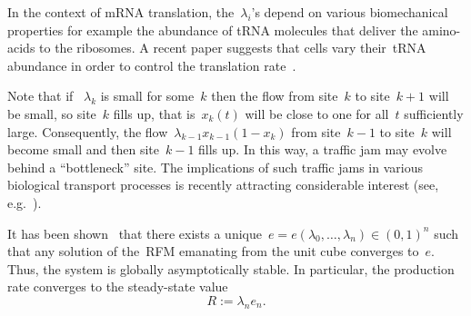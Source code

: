 In the context of mRNA translation, the~$\lambda_i$'s depend on various biomechanical properties for example the abundance of tRNA molecules that deliver the amino-acids to the ribosomes. 
A recent paper suggests  that cells vary their~tRNA abundance in order to control the translation rate~\cite{Torrenteaat6409}. 

Note that if  ~$\lambda_k$ is   small for some~$k$ then the flow from site~$k$ to site~$k+1$ will be small, so site~$k$ fills up, that is~$x_k(t)$ will be close to one for all~$t$ sufficiently large. 
Consequently, the flow~$\lambda_{k-1} x_{k-1}  (1-x_{k} )$ from site~$k-1$ to site~$k$ will become small and then site~$k-1$ fills up. 
In this way, a traffic jam may evolve behind a ``bottleneck'' site.
The implications of such traffic jams in various biological transport processes is recently attracting  considerable interest (see, e.g.~\cite{tuller_traffic_jams2018,neurojams}).

It has been shown~\cite{margaliot2012stability} that there exists a unique~$e=e(\lambda_0,\dots,\lambda_n) \in(0,1)^n$ such that  any solution of the~\ac{RFM}  emanating from  the unit cube converges to~$e$. 
Thus, the system is globally asymptotically  stable. In particular, the production rate converges to the steady-state value 
\begin{equation}
	R:=\lambda_n e_n. 
\end{equation}

